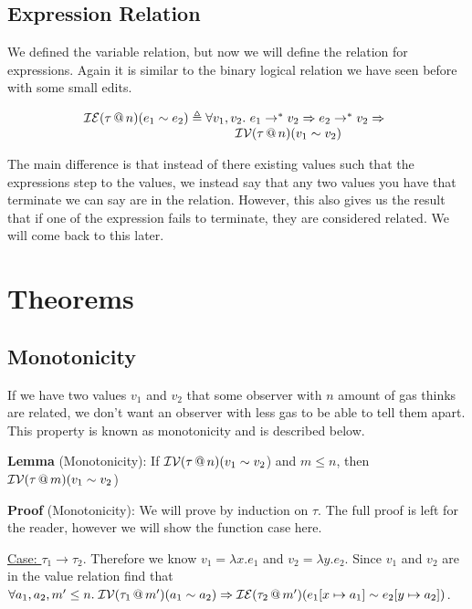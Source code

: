 \documentclass{lecturenotes}
\makeatletter
\newcommand{\spa}{\mkern5mu}
\newcommand{\inval}[4]{\ensuremath{\mathcal{I}\mathcal{V}(#1 \mkern3mu @ \mkern3mu #2)(#3 \sim #4})}
\newcommand{\inexpr}[4]{\ensuremath{\mathcal{I}\mathcal{E}(#1 \mkern3mu @ \mkern3mu #2)(#3 \sim #4})}
\makeatother
\begin{document}
\subsection{Expression Relation}

We defined the variable relation, but now we will define the relation for expressions. 
  Again it is similar to the binary logical relation we have seen before with some small edits. 

$$\begin{array}{r@{\;\triangleq\;}l} 
  \inexpr{\tau}{n}{e_1}{e_2} 
    & \forall v_1, v_2.\, \hspace{-1.5em}
    \begin{array}[t]{l}\hspace{1.15em}
      e_1 \to^* v_2 \Rightarrow e_2 \to^* v_2 \Rightarrow \\
      {} \inval{\tau}{n}{v_1}{v_2}\\
    \end{array}  
\end{array}$$

The main difference is that instead of there existing values such that the expressions step to the values, we instead say that any two values you have that terminate we can say are in the relation. 
  However, this also gives us the result that if one of the expression fails to terminate, they are considered related. 
  We will come back to this later. 

\section{Theorems}

\subsection{Monotonicity}

If we have two values $v_1$ and $v_2$ that some observer with $n$ amount of gas thinks are related, we don't want an observer with less gas to be able to tell them apart. 
  This property is known as monotonicity and is described below.

\textbf{Lemma} (Monotonicity): If \inval{\tau}{n}{v_1}{v_2} and $m \leq n$, then \inval{\tau}{m}{v_1}{v_2}

\textbf{Proof} (Monotonicity): We will prove by induction on $\tau$. 
  The full proof is left for the reader, however we will show the function case here. 

\underline{Case: $\tau_1 \to \tau_2$}. Therefore we know $v_1 = \lambda x.e_1$ and $v_2 = \lambda y.e_2$. 
  Since $v_1$ and $v_2$ are in the value relation find that $\forall a_1, a_2, m' \leq n. \spa \inval{\tau_1}{m'}{a_1}{a_2} \Rightarrow \inexpr{\tau_2}{m'}{e_1[x \mapsto a_1]}{e_2[y \mapsto a_2]}$.
\end{document}
